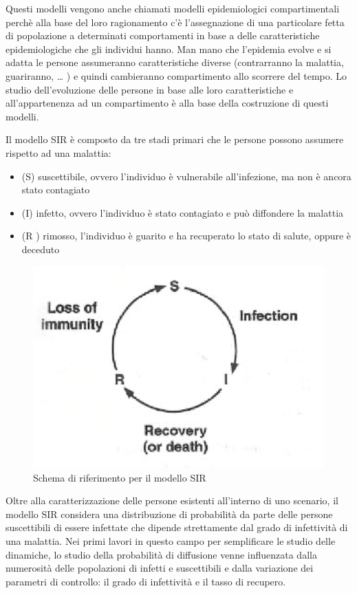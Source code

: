 Questi modelli vengono anche chiamati modelli epidemiologici compartimentali \cite{ScienceConnectedAge} perchè alla base del loro ragionamento c'è l'assegnazione di una particolare fetta di popolazione a determinati comportamenti in base a delle caratteristiche epidemiologiche che gli individui hanno. Man mano che l'epidemia evolve e si adatta le persone assumeranno caratteristiche diverse (contrarranno la malattia, guariranno, … ) e quindi cambieranno compartimento allo scorrere del tempo. Lo studio dell'evoluzione delle persone in base alle loro caratteristiche e all'appartenenza ad un compartimento è alla base della costruzione di questi modelli.

Il modello SIR è composto da tre stadi primari che le persone possono assumere rispetto ad una malattia: 
\begin{itemize}
    \item (S) suscettibile, ovvero l'individuo è vulnerabile all'infezione, ma non è ancora stato contagiato
    \item (I) infetto, ovvero l'individuo è stato contagiato e può diffondere la malattia
    \item (R ) rimosso, l'individuo è guarito e ha recuperato lo stato di salute, oppure è deceduto
\end{itemize}

\begin{figure}[H]
    \centering
    \includegraphics[width=.5\textwidth]{resources/sir_circle.png}
    \caption{Schema di riferimento per il modello SIR} 
\end{figure}

Oltre alla caratterizzazione delle persone esistenti all'interno di uno scenario, il modello SIR considera una distribuzione di probabilità da parte delle persone suscettibili di essere infettate che dipende strettamente dal grado di infettività di una malattia. Nei primi lavori in questo campo per semplificare le studio delle dinamiche, lo studio della probabilità di diffusione venne influenzata dalla numerosità delle popolazioni di infetti e suscettibili e dalla variazione dei parametri di controllo: il grado di infettività e il tasso di recupero.


